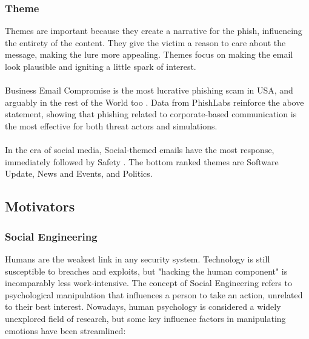 \documentclass[a4paper]{article}
\begin{document}
\subsubsection{Theme}

Themes are important because they create a narrative for the phish, influencing the entirety of the content. They give the victim a reason to care about the message, making the lure more appealing. Themes focus on making the email look plausible and igniting a little spark of interest.
\\ \\
Business Email Compromise is the most lucrative phishing scam in USA, and arguably in the rest of the World too \cite{report-ic3}. Data from PhishLabs \cite{report-phishlabs-2019} reinforce the above statement, showing that phishing related to corporate-based communication is the most effective for both threat actors and simulations.
\\ \\
In the era of social media, Social-themed emails have the most response, immediately followed by Safety \cite{report-phishme}. The bottom ranked themes are Software Update, News and Events, and Politics.

\subsection{Motivators}

\subsubsection{Social Engineering}

Humans are the weakest link in any security system. Technology is still susceptible to breaches and exploits, but "hacking the human component" is incomparably less work-intensive. The concept of Social Engineering refers to psychological manipulation that influences a person to take an action, unrelated to their best interest. Nowadays, human psychology is considered a widely unexplored field of research, but some key influence factors in manipulating emotions have been streamlined:
\end{document}
